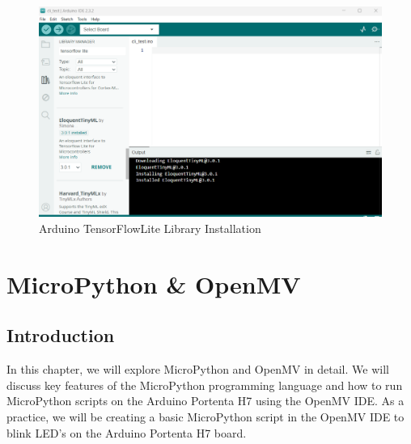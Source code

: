 \begin{figure}
	\begin{center}
		\includegraphics[width=0.7\linewidth]{Images/TensorFlowLite/TLFMicroLibrary.png}
		\caption{Arduino TensorFlowLite Library Installation}
		\label{TflLibraryInstallation}
	\end{center}
\end{figure}

\chapter{MicroPython \& OpenMV}
\section{Introduction}
In this chapter, we will explore MicroPython and OpenMV in detail. We will discuss key features of the MicroPython programming language and how to run MicroPython scripts on the Arduino Portenta H7 using the OpenMV IDE. As a practice, we will be creating a basic MicroPython script in the OpenMV IDE to blink LED’s on the Arduino Portenta H7 board.

